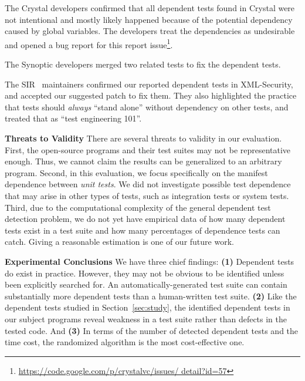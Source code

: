 The Crystal developers confirmed that all dependent tests
found in Crystal were not intentional and mostly likely
happened because of the potential dependency
caused by global variables. The developers treat the
dependencies as undesirable and opened a bug report for
this report issue\footnote{\url{https://code.google.com/p/crystalvc/issues/ detail?id=57}}.

The Synoptic developers merged two related tests to fix
the dependent tests.

The SIR~\cite{sir} maintainers confirmed our reported dependent
tests in XML-Security, and accepted our
suggested patch to fix them. They also highlighted the practice
that tests should \textit{always} ``stand alone''
without dependency on other tests, and treated that as
``test engineering 101''. 

\vspace{1mm}
\noindent \textbf{Threats to Validity}
There are several threats to validity in our evaluation.
First, the \subjnum open-source
programs and their test suites may not be
representative enough. Thus, we cannot claim the results
can be generalized to an arbitrary program.
Second, in this evaluation, we focus specifically on
the {manifest dependence} between \textit{unit tests}.
We did not investigate possible test dependence that may arise
in other types of tests, such as integration tests
or system tests.
Third, due to the computational complexity of the general dependent test
detection problem, we do not yet have
empirical data of how many dependent
tests exist in a test suite and how many percentages of dependence tests
\ourtool can catch.  Giving a reasonable estimation is one of our future work.


\vspace{1mm}

\noindent \textbf{Experimental Conclusions}
We have three chief findings: \textbf{(1)}
Dependent tests do exist in practice. However,
they may not be obvious to be identified
unless been explicitly searched for.
An automatically-generated test suite can contain
substantially more dependent tests than a human-written
test suite.
\textbf{(2)} Like the dependent tests
studied in Section~\ref{sec:study}, the identified
dependent tests in our subject programs reveal weakness
in a test suite rather than defects in the tested code.
And \textbf{(3)} In terms
of the number of detected dependent tests
and the time cost, the randomized algorithm is the
most cost-effective one.


